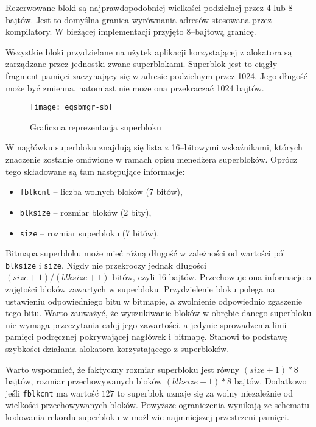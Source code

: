 \documentclass[12pt,a4paper,titlepage,twoside]{mwart}
\begin{document}
Rezerwowane bloki są najprawdopodobniej wielkości podzielnej przez $4$ lub $8$
bajtów. Jest to domyślna granica wyrównania adresów stosowana przez
kompilatory. W bieżącej implementacji przyjęto $8$--bajtową granicę.

Wszystkie bloki przydzielane na użytek aplikacji korzystającej z alokatora są
zarządzane przez jednostki zwane superblokami. Superblok jest to ciągły
fragment pamięci zaczynający się w adresie podzielnym przez 1024. Jego długość
może być zmienna, natomiast nie może ona przekraczać 1024 bajtów.

\begin{figure}[ht]
\centering
\texttt{[image: eqsbmgr-sb]}
\caption{Graficzna reprezentacja superbloku}
\end{figure}

W nagłówku superbloku znajdują się lista z 16--bitowymi wskaźnikami, których
znaczenie zostanie omówione w ramach opisu menedżera superbloków. Oprócz tego
składowane są tam następujące informacje:
\begin{itemize}
\item \texttt{fblkcnt} -- liczba wolnych bloków (7 bitów),
\item \texttt{blksize} -- rozmiar bloków (2 bity),
\item \texttt{size} -- rozmiar superbloku (7 bitów).
\end{itemize}

Bitmapa superbloku może mieć różną długość w zależności od wartości pól
\texttt{blksize} i \texttt{size}. Nigdy nie przekroczy jednak długości $(size +
1) / (blksize + 1)$ bitów, czyli 16 bajtów. Przechowuje ona informacje o
zajętości bloków zawartych w superbloku. Przydzielenie bloku polega na
ustawieniu odpowiedniego bitu w bitmapie, a zwolnienie odpowiednio zgaszenie
tego bitu. Warto zauważyć, że wyszukiwanie bloków w obrębie danego superbloku
nie wymaga przeczytania całej jego zawartości, a jedynie sprowadzenia linii
pamięci podręcznej pokrywającej nagłówek i bitmapę. Stanowi to podstawę
szybkości działania alokatora korzystającego z superbloków.

Warto wspomnieć, że faktyczny rozmiar superbloku jest równy $(size + 1) * 8$
bajtów, rozmiar przechowywanych bloków $(blksize + 1) * 8$ bajtów. Dodatkowo
jeśli \texttt{fblkcnt} ma wartość $127$ to superblok uznaje się za wolny
niezależnie od wielkości przechowywanych bloków. Powyższe ograniczenia wynikają
ze schematu kodowania rekordu superbloku w możliwie najmniejszej przestrzeni
pamięci.
\end{document}
